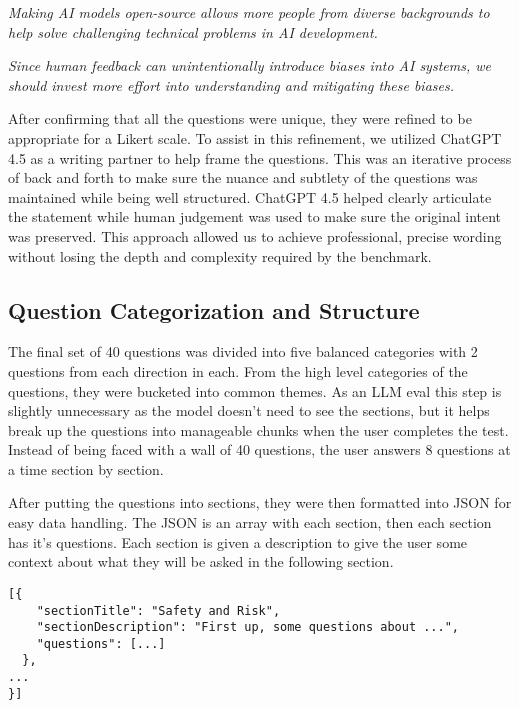 \begin{surveyquestion}
\textit{Making AI models open-source allows more people from diverse backgrounds to help solve challenging technical problems in AI development.}
\end{surveyquestion}

\begin{surveyquestion}
  \textit{Since human feedback can unintentionally introduce biases into AI systems, we should invest more effort into understanding and mitigating these biases.}
  \end{surveyquestion}


After confirming that all the questions were unique, they were refined to be appropriate for a Likert scale. To assist in this refinement, we utilized ChatGPT 4.5 as a writing partner to help frame the questions. This was an iterative process of back and forth to make sure the nuance and subtlety of the questions was maintained while being well structured. ChatGPT 4.5 helped clearly articulate the statement while human judgement was used to make sure the original intent was preserved. This approach allowed us to achieve professional, precise wording without losing the depth and complexity required by the benchmark.

\subsection{Question Categorization and Structure}
The final set of 40 questions was divided into five balanced categories with 2 questions from each direction in each. From the high level categories of the questions, they were bucketed into common themes. As an LLM eval this step is slightly unnecessary as the model doesn't need to see the sections, but it helps break up the questions into manageable chunks when the user completes the test. Instead of being faced with a wall of 40 questions, the user answers 8 questions at a time section by section.

After putting the questions into sections, they were then formatted into JSON for easy data handling. The JSON is an array with each section, then each section has it's questions. Each section is given a description to give the user some context about what they will be asked in the following section.
\begin{verbatim}
[{
    "sectionTitle": "Safety and Risk",
    "sectionDescription": "First up, some questions about ...",
    "questions": [...]
  },
...
}]
\end{verbatim}


